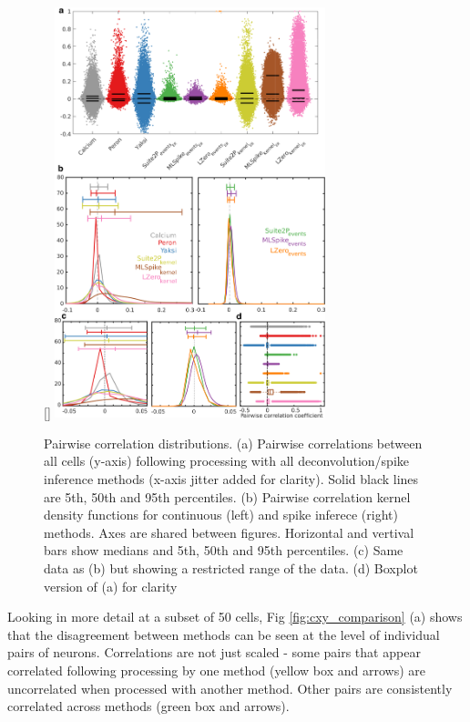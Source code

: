 \documentclass[a4paper,10pt,twocolumn]{article}
\begin{document}

\begin{figure}
[\FBwidth]
{\includegraphics[width=0.7\textwidth]{full_figs_19v2/why_deconvolve_F9_19v2.png}}
{\caption{\label{fig:cxy_dist}Pairwise correlation distributions. (a) Pairwise correlations between all cells (y-axis) following processing with all deconvolution/spike inference methods (x-axis jitter added for clarity). Solid black lines are 5th, 50th and 95th percentiles. (b) Pairwise correlation kernel density functions for continuous (left) and spike inferece (right) methods. Axes are shared between figures.  Horizontal and vertival bars show medians and 5th, 50th and 95th percentiles. (c) Same data as (b) but showing a restricted range of the data. (d) Boxplot version of (a) for clarity}}
\end{figure}

Looking in more detail at a subset of 50 cells, Fig \ref{fig:cxy_comparison} (a) shows that the disagreement between methods can be seen at the level of individual pairs of neurons.  Correlations are not just scaled - some pairs that appear correlated following processing by one method (yellow box and arrows) are uncorrelated when processed with another method. Other pairs are consistently correlated across methods (green box and arrows). 
\end{document}
